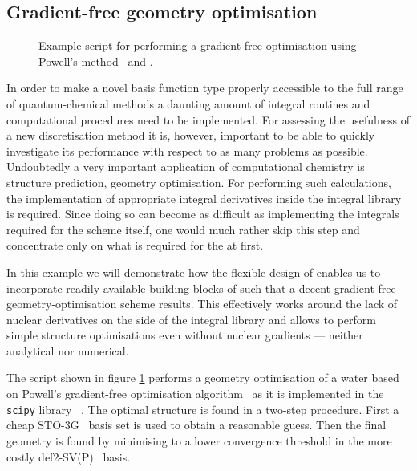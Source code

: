 \subsection{Gradient-free geometry optimisation}
\label{sec:ex:geo}

\begin{figure}
	\centering
	\begin{minipage}{0.58\textwidth}
	
	\end{minipage}
	\caption[\python script for performing gradient-free optimisation]{
		Example \python script for performing a gradient-free optimisation
		using Powell's method~\cite{Powell1964,Press1992} and \molsturm.
	}
	\label{fig:codeGeoOpt}
\end{figure}
\newcommand{\lgbasone}{36\xspace}
\newcommand{\lgbastwo}{41\xspace}

In order to make a novel basis function type properly accessible
to the full range of quantum-chemical methods
a daunting amount of integral routines and computational procedures
need to be implemented.
For assessing the usefulness of a new discretisation method it is, however,
important to be able to quickly investigate its performance with respect to
as many problems as possible.
Undoubtedly a very important application of computational chemistry
is structure prediction, \ie geometry optimisation.
For performing such calculations,
the implementation of appropriate integral derivatives
inside the integral library is required.
Since doing so can become as difficult as implementing the integrals
required for the \SCF scheme itself,
one would much rather skip this step and concentrate
only on what is required for the \SCF at first.

In this example we will demonstrate how the flexible design of \molsturm
enables us to incorporate readily available building blocks of \python
such that a decent gradient-free geometry-optimisation scheme results.
This effectively works around the lack of nuclear derivatives
on the side of the integral library
and allows to perform simple structure optimisations
even without nuclear gradients --- neither analytical nor numerical.

The script shown in figure \ref{fig:codeGeoOpt}
performs a geometry optimisation of a water
based on Powell's gradient-free optimisation algorithm~\cite{Powell1964,Press1992}
as it is implemented in the \texttt{scipy} library%
~\cite{Walt2011,scipyWeb}.
The optimal structure is found in a two-step procedure.
First a cheap \mbox{STO-3G}~\cite{Hehre1969} basis set is used to obtain
a reasonable guess.
Then the final geometry is found
by minimising to a lower convergence threshold in the more costly
\mbox{def2-SV(P)}~\cite{Weigend2005} basis.

